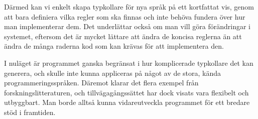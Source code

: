 \documentclass{popsci}
\begin{document}
{Därmed kan vi enkelt skapa typkollare för nya språk på ett kortfattat vis, genom att bara definiera vilka regler som ska finnas och inte behöva fundera över hur man implementerar dem.
Det underlättar också om man vill göra förändringar i systemet, eftersom det är mycket lättare att ändra de koncisa reglerna än att ändra de många raderna kod som kan krävas för att implementera den.

I nuläget är programmet ganska begränsat i hur komplicerade typkollare det kan generera, och skulle inte kunna appliceras på något av de stora, kända programmeringsspråken.
Däremot klarar det flera exempel från forskningslitteraturen, och tillvägagångssättet har dock visats vara flexibelt och utbyggbart.
Man borde alltså kunna vidareutveckla programmet för ett bredare stöd i framtiden.


%
%
}
\end{document}
